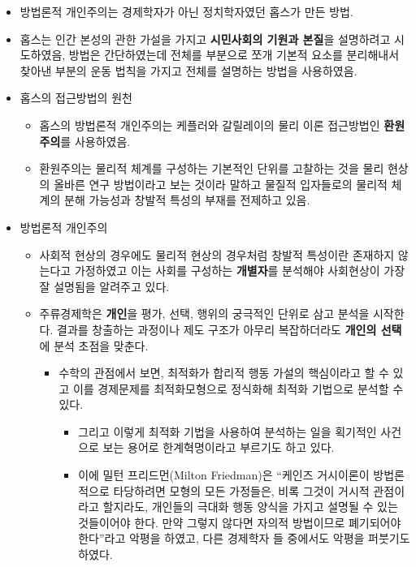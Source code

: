 \documentclass{report}
\begin{document}
\begin{itemize}
    \begin{itemize}
        \item 방법론적 개인주의는 경제학자가 아닌 정치학자였던 홉스가 만든 방법.
        \item 홉스는 인간 본성의 관한 가설을 가지고 \textbf{시민사회의 기원과 본질}을 설명하려고 시도하였음, 방법은 간단하였는데 전체를 부분으로 쪼개 기본적 요소를 분리해내서 찾아낸 부분의 운동 법칙을 가지고 전체를 설명하는 방법을 사용하였음.
        \item 홉스의 접근방법의 원천
        \begin{itemize}
            \item 홉스의 방법론적 개인주의는 케플러와 갈릴레이의 물리 이론 접근방법인 \textbf{환원주의}를 사용하였음.
            \item 환원주의는 물리적 체계를 구성하는 기본적인 단위를 고찰하는 것을 물리 현상의 올바른 연구 방법이라고 보는 것이라 말하고 물질적 입자들로의 물리적 체계의 분해 가능성과 창발적 특성의 부재를 전제하고 있음.
        \end{itemize}
        \item 방법론적 개인주의
        \begin{itemize}
            \item 사회적 현상의 경우에도 물리적 현상의 경우처럼 창발적 특성이란 존재하지 않는다고 가정하였고 이는 사회를 구성하는 \textbf{개별자}를 분석해야 사회현상이 가장 잘 설명됨을 알려주고 있다.
            \item 주류경제학은 \textbf{개인}을 평가, 선택, 행위의 궁극적인 단위로 삼고 분석을 시작한다. 결과를 창출하는 과정이나 제도 구조가 아무리 복잡하더라도 \textbf{개인의 선택}에 분석 초점을 맞춘다.
            \begin{itemize}
                \item 수학의 관점에서 보면, 최적화가 합리적 행동 가설의 핵심이라고 할 수 있고 이를 경제문제를 최적화모형으로 정식화해 최적화 기법으로 분석할 수 있다.
                \begin{itemize}
                    \item 그리고 이렇게 최적화 기법을 사용하여 분석하는 일을 획기적인 사건으로 보는 용어로 한계혁명이라고 부르기도 하고 있다.
                    \item 이에 밀턴 프리드먼(Milton Friedman)은 ``케인즈 거시이론이 방법론적으로 타당하려면 모형의 모든 가정들은, 비록 그것이 거시적 관점이라고 할지라도, 개인들의 극대화 행동 양식을 가지고 설명될 수 있는 것들이어야 한다. 만약 그렇지 않다면 자의적 방법이므로 폐기되어야 한다''라고 악평을 하였고, 다른 경제학자 들 중에서도 악평을 퍼붓기도 하였다.

\end{itemize}
\end{itemize}
\end{itemize}
\end{itemize}
\end{itemize}
\end{document}
